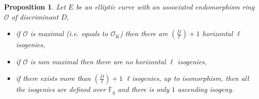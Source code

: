 \documentclass{lms}
\newtheorem{prop}[thm]{Proposition}
\begin{document}
\begin{prop} %
Let $E$ be an elliptic curve with an associated endomorphism ring $\mathcal{O}$ of discriminant $D$, %
\begin{itemize}
\item if $\mathcal{O}$ is maximal (i.e. equals to $\mathcal{O}_K$) then there are $\left( \frac{D}{\ell} \right) +1 $ horizontal $\ell$ isogenies,
\item if $\mathcal{O}$ is non maximal then there are no horizontal $\ell$ isogenies,
\item if there exists more than $\left( \frac{D}{\ell} \right) +1 $  $\ell$isogenies, up to isomorphism, then all the isogenies are defined over $\mathbb{F}_q$ and there is only $1$ ascending isogeny. 
\end{itemize}
\end{prop} 
\end{document}
